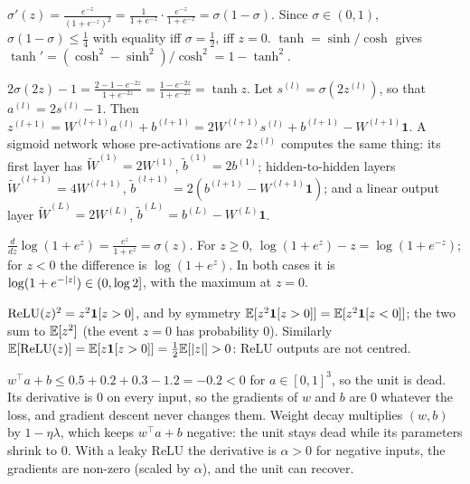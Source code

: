 \section{}

$\sigma'(z) = \frac{e^{-z}}{(1 + e^{-z})^2} = \frac1{1 + e^{-z}}\cdot\frac{e^{-z}}{1 + e^{-z}} = \sigma(1 - \sigma)$. Since $\sigma\in(0,1)$, $\sigma(1 - \sigma)\leq\frac14$ with equality iff $\sigma = \frac12$, iff
$z = 0$. $\tanh = \sinh/\cosh$ gives $\tanh' = (\cosh^2 - \sinh^2)/\cosh^2 = 1 - \tanh^2$.

$2\sigma(2z) - 1 = \frac{2 - 1 - e^{-2z}}{1 + e^{-2z}} = \frac{1 - e^{-2z}}{1 + e^{-2z}} = \tanh z$. Let $s^{(l)} = \sigma(2z^{(l)})$, so that $a^{(l)} = 2s^{(l)} - 1$. Then
$z^{(l+1)} = W^{(l+1)}a^{(l)} + b^{(l+1)} = 2W^{(l+1)}s^{(l)} + b^{(l+1)} - W^{(l+1)}\mathbf 1$. A sigmoid network whose pre-activations are $2z^{(l)}$
computes the same thing: its first layer has $\tilde W^{(1)} = 2W^{(1)}$, $\tilde b^{(1)} = 2b^{(1)}$; hidden-to-hidden layers
$\tilde W^{(l+1)} = 4W^{(l+1)}$, $\tilde b^{(l+1)} = 2(b^{(l+1)} - W^{(l+1)}\mathbf 1)$; and a linear output layer
$\tilde W^{(L)} = 2W^{(L)}$, $\tilde b^{(L)} = b^{(L)} - W^{(L)}\mathbf 1$.

$\frac d{dz}\log(1 + e^z) = \frac{e^z}{1 + e^z} = \sigma(z)$. For $z\geq0$, $\log(1 + e^z) - z = \log(1 + e^{-z})$; for $z<0$ the difference is
$\log(1 + e^z)$. In both cases it is $\log(1 + e^{-\left|z\right|})\in(0,\log2]$, with the maximum at $z = 0$.

$\mathrm{ReLU}(z)^2 = z^2\mathbf{1}[z>0]$, and by symmetry $\mathbb{E}[z^2\mathbf{1}[z>0]] = \mathbb{E}[z^2\mathbf{1}[z<0]]$; the two sum to $\mathbb{E}[z^2]$ (the event $z = 0$
has probability $0$). Similarly $\mathbb{E}[\mathrm{ReLU}(z)] = \mathbb{E}[z\mathbf{1}[z>0]] = \frac12\mathbb{E}[\left|z\right|]>0$: ReLU outputs are not centred.

$w^\top a + b\leq0.5 + 0.2 + 0.3 - 1.2 = -0.2<0$ for $a\in[0,1]^3$, so the unit is dead. Its derivative is $0$ on every input, so
the gradients of $w$ and $b$ are $0$ whatever the loss, and gradient descent never changes
them. Weight decay multiplies $(w, b)$ by $1 - \eta\lambda$, which keeps $w^\top a + b$ negative: the unit stays dead while
its parameters shrink to $0$. With a leaky ReLU the derivative is $\alpha>0$ for negative inputs, the
gradients are non-zero (scaled by $\alpha$), and the unit can recover.

